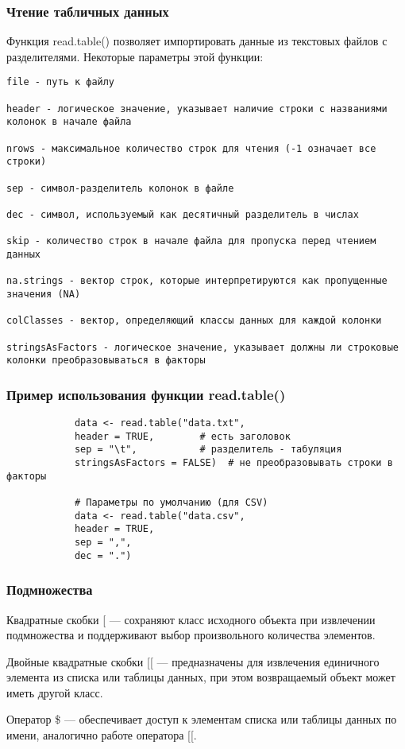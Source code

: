 \documentclass[14pt,a4paper]{beamer}
\begin{document}
	
	\begin{frame}[fragile]
		\frametitle{Чтение табличных данных}
		Функция read.table() позволяет импортировать данные из текстовых файлов с разделителями. Некоторые параметры этой функции:
		{\fontsize{6}{7}\selectfont
		\begin{verbatim}
file - путь к файлу
			
header - логическое значение, указывает наличие строки с названиями колонок в начале файла
			
nrows - максимальное количество строк для чтения (-1 означает все строки)
			
sep - символ-разделитель колонок в файле
			
dec - символ, используемый как десятичный разделитель в числах
			
skip - количество строк в начале файла для пропуска перед чтением данных
			
na.strings - вектор строк, которые интерпретируются как пропущенные значения (NA)
			
colClasses - вектор, определяющий классы данных для каждой колонки
			
stringsAsFactors - логическое значение, указывает должны ли строковые колонки преобразовываться в факторы
		\end{verbatim}
	}
	\end{frame}
	
	
	\begin{frame}[fragile]
		\frametitle{Пример использования функции read.table()}
		\begin{verbatim}
			data <- read.table("data.txt", 
			header = TRUE,        # есть заголовок
			sep = "\t",           # разделитель - табуляция
			stringsAsFactors = FALSE)  # не преобразовывать строки в факторы
			
			# Параметры по умолчанию (для CSV)
			data <- read.table("data.csv", 
			header = TRUE,
			sep = ",",
			dec = ".")
		\end{verbatim}
	\end{frame}
	
	
	\begin{frame}[fragile]
		\frametitle{Подмножества}
		Квадратные скобки [ — сохраняют класс исходного объекта при извлечении подмножества и поддерживают выбор произвольного количества элементов.
		
		Двойные квадратные скобки [[ — предназначены для извлечения единичного элемента из списка или таблицы данных, при этом возвращаемый объект может иметь другой класс.
		
		Оператор \$ — обеспечивает доступ к элементам списка или таблицы данных по имени, аналогично работе оператора [[.
		
		
		
	\end{frame}
	
\end{document}

